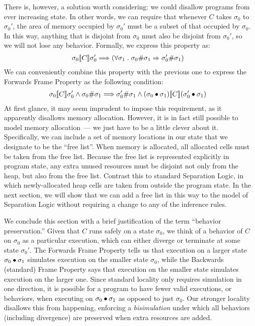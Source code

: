 There is, however, a solution worth considering: we could disallow programs from ever increasing state.
In other words, we can require that whenever $C$ takes $\sigma_0$ to $\sigma_0'$, the area of
memory occupied by $\sigma_0'$ must be a subset of that occupied by $\sigma_0$. In this way,
anything that is disjoint from $\sigma_0$ must also be disjoint from $\sigma_0'$, so we
will not lose any behavior. Formally, we express this property as:
{\small\begin{align*}
\relate{\den{C}}{\sigma_0}{\sigma_0'} \Longrightarrow (\forall \sigma_1 \such \sigma_0 \# \sigma_1 \Rightarrow \sigma_0' \# \sigma_1)
\end{align*}}
\indent{}We can conveniently combine this property with the previous one to express
the Forwards Frame Property as the following condition:
{\small
\begin{align*}
\relate{\den{C}}{\sigma_0}{\sigma_0'} \land \sigma_0 \# \sigma_1 \Longrightarrow 
  \sigma_0' \# \sigma_1 \land \relate{\den{C}}{(\sigma_0 \dt \sigma_1)}{(\sigma_0' \dt \sigma_1)}
\end{align*}}
\indent{}At first glance, it may seem imprudent to impose this requirement,
as it apparently disallows memory allocation. However, it is in fact still possible to model 
memory allocation~--- we just have to be a little clever about it. Specifically, we can include
a set of memory locations in our state that we designate to be the ``free list''. When memory
is allocated, all allocated cells must be taken from the free list. Because the free list
is represented explicitly in program state, any extra unused resources must be disjoint
not only from the heap, but also from the free list. Contrast this to standard 
Separation Logic, in which newly-allocated heap cells are taken from outside the program 
state. In the next section, we will show that we can add a free list in this way to the 
model of Separation Logic without requiring a change to any of the inference rules.

We conclude this section with a brief justification of the term ``behavior preservation.''
Given that $C$ runs safely on a state $\sigma_0$, we think of a behavior of $C$ on $\sigma_0$ as
a particular execution, which can either diverge or terminate at some state $\sigma_0'$. 
The Forwards Frame Property tells us that execution on a larger state $\sigma_0 \dt \sigma_1$
simulates execution on the smaller state $\sigma_0$, while the Backwards (standard) Frame Property
says that execution on the smaller state simulates execution on the larger one. Since standard locality
only requires simulation in one direction, it is possible for a program to have fewer valid executions, or 
behaviors, when executing on $\sigma_0 \dt \sigma_1$ as opposed to just $\sigma_0$. Our stronger
locality disallows this from happening, enforcing a \emph{bisimulation} under which all 
behaviors (including divergence) are preserved when extra resources are added.
